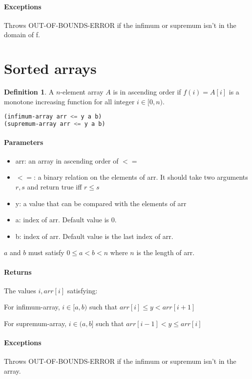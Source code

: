 \documentclass{article}
\theoremstyle{definition}
\newtheorem{defn}{Definition}
\begin{document}
\paragraph{Exceptions}
Throws OUT-OF-BOUNDS-ERROR if the infimum or supremum isn't in the domain of f.

\section{Sorted arrays}

\begin{defn}
A $n$-element array $A$ is in ascending order
if $f(i) = A[i]$ is a monotone increasing function for all integer $i \in [0,n)$.
\end{defn}


\begin{lstlisting}[language=Lisp]
(infimum-array arr <= y a b)
(supremum-array arr <= y a b)
\end{lstlisting}

\paragraph{Parameters}
\begin{itemize}
\item arr: an array in ascending order of $<=$
\item $<=$: a binary relation on the elements of arr. It should take
	two arguments $r, s$ and return true iff $r \le s$
\item y: a value that can be compared with the elements of arr
\item a: index of arr. Default value is 0.
\item b: index of arr. Default value is the last index of arr.
\end{itemize}

$a$ and $b$ must satisfy
$0 \le a < b < n$ where $n$ is the length of arr.

\paragraph{Returns}
The values $i, arr[i]$ satisfying:

For infimum-array, $i \in [a,b)$ such that $arr[i] \le y < arr[i+1]$

For supremum-array, $i \in (a,b]$ such that $arr[i-1] < y \le arr[i]$

\paragraph{Exceptions}
Throws OUT-OF-BOUNDS-ERROR if the infimum or supremum isn't in the array.
\end{document}
